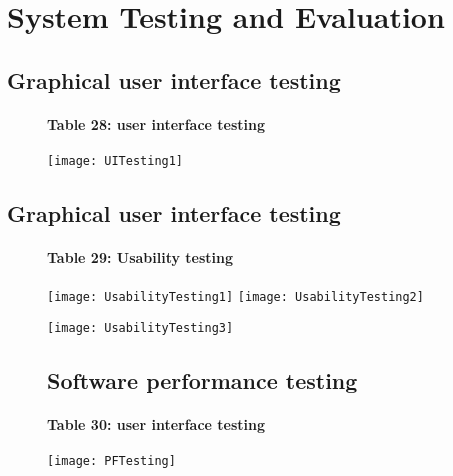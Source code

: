\chapter{System Testing and Evaluation}\label{chap:testingEvaluation}


\section*{}
\section{Graphical user interface testing}
\begin{figure}[ht]
\subsubsection{Table 28: user interface testing}
\centering
\texttt{[image: UITesting1]}
\end{figure}

\section{Graphical user interface testing}
\begin{figure}[ht]
\subsubsection{Table 29: Usability testing}
\centering
\texttt{[image: UsabilityTesting1]}
\texttt{[image: UsabilityTesting2]}
\end{figure}

\begin{figure}
\centering
\texttt{[image: UsabilityTesting3]}
\end{figure}

\begin{figure}
\section{Software performance testing}
\subsubsection{Table 30: user interface testing}
\centering
\texttt{[image: PFTesting]}
\end{figure}

